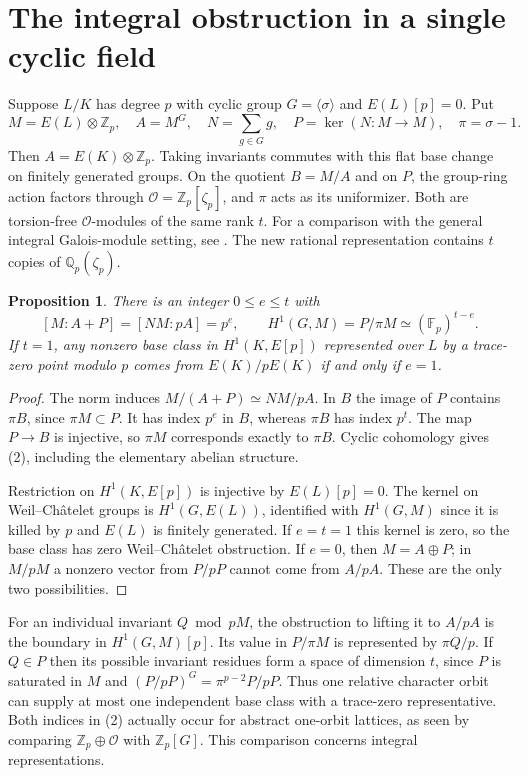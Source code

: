 \documentclass[11pt]{article}
\newtheorem{proposition}[theorem]{Proposition}
\newcommand{\Z}{\mathbb Z}
\newcommand{\Q}{\mathbb Q}
\newcommand{\F}{\mathbb F}
\begin{document}
\section{The integral obstruction in a single cyclic field}
Suppose $L/K$ has degree $p$ with cyclic group $G=\langle\sigma\rangle$
and $E(L)[p]=0$. Put
\[
 M=E(L)\otimes\Z_p,\quad A=M^G,\quad
 N=\sum_{g\in G}g,\quad P=\ker(N:M\to M),\quad \pi=\sigma-1 .
\]
Then $A=E(K)\otimes\Z_p$. Taking invariants commutes with this
flat base change on finitely generated groups. On the quotient
$B=M/A$ and on $P$, the group-ring action factors through
$\mathcal O=\Z_p[\zeta_p]$, and $\pi$ acts as its uniformizer.
Both are torsion-free $\mathcal O$-modules of the same rank $t$.
For a comparison with the general integral Galois-module setting, see
\cite{VW}. The new rational representation contains $t$ copies of $\Q_p(\zeta_p)$.

\begin{proposition}\label{prop:index}
There is an integer $0\le e\le t$ with
\[
 [M:A+P]=[NM:pA]=p^e,\qquad
 H^1(G,M)=P/\pi M\simeq(\F_p)^{t-e}.
 \tag{2}
\]
If $t=1$, any nonzero base class in $H^1(K,E[p])$ represented over
$L$ by a trace-zero point modulo $p$ comes from $E(K)/pE(K)$
if and only if $e=1$.
\end{proposition}
\begin{proof}
The norm induces $M/(A+P)\simeq NM/pA$. In $B$ the image of
$P$ contains $\pi B$, since $\pi M\subset P$.
It has index $p^e$ in $B$, whereas $\pi B$ has index $p^t$.
The map $P\to B$ is injective, so $\pi M$ corresponds exactly to
$\pi B$. Cyclic cohomology gives (2), including the elementary
abelian structure.

Restriction on $H^1(K,E[p])$ is injective by $E(L)[p]=0$.
The kernel on Weil--Ch\^atelet groups is $H^1(G,E(L))$, identified
with $H^1(G,M)$ since it is killed by $p$ and $E(L)$ is finitely
generated. If $e=t=1$ this kernel is zero, so the base class has
zero Weil--Ch\^atelet obstruction. If $e=0$, then $M=A\oplus P$;
in $M/pM$ a nonzero vector from $P/pP$ cannot come from $A/pA$.
These are the only two possibilities.
\end{proof}

For an individual invariant $Q\bmod pM$, the obstruction to lifting
it to $A/pA$ is the boundary in $H^1(G,M)[p]$. Its value in
$P/\pi M$ is represented by $\pi Q/p$. If $Q\in P$ then its
possible invariant residues form a space of dimension $t$, since
$P$ is saturated in $M$ and
$(P/pP)^G=\pi^{p-2}P/pP$. Thus one relative character orbit can
supply at most one independent base class with a trace-zero
representative. Both indices in (2) actually occur for abstract
one-orbit lattices, as seen by comparing $\Z_p\oplus\mathcal O$
with $\Z_p[G]$. This comparison concerns integral representations.
\end{document}
